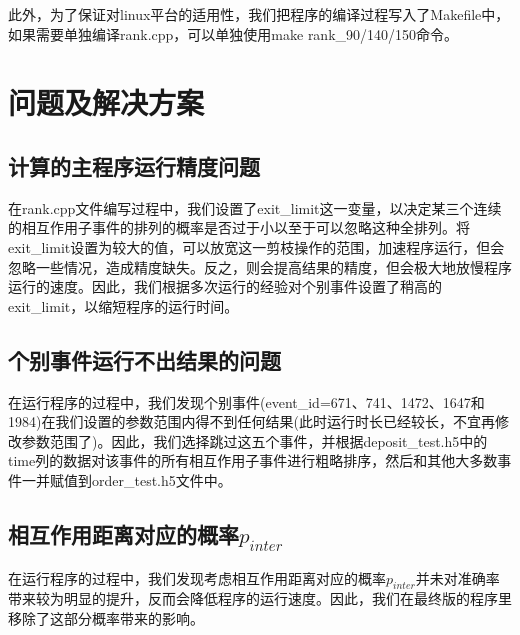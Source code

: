 \documentclass[12pt,a4paper]{article}%
\begin{document}
此外，为了保证对linux平台的适用性，我们把程序的编译过程写入了Makefile中，如果需要单独编译rank.cpp，可以单独使用make rank\_90/140/150命令。

\newpage
\section{问题及解决方案}
\subsection{计算的主程序运行精度问题}
在rank.cpp文件编写过程中，我们设置了exit\_limit这一变量，以决定某三个连续的相互作用子事件的排列的概率是否过于小以至于可以忽略这种全排列。将exit\_limit设置为较大的值，可以放宽这一剪枝操作的范围，加速程序运行，但会忽略一些情况，造成精度缺失。反之，则会提高结果的精度，但会极大地放慢程序运行的速度。因此，我们根据多次运行的经验对个别事件设置了稍高的exit\_limit，以缩短程序的运行时间。

\subsection{个别事件运行不出结果的问题}
在运行程序的过程中，我们发现个别事件(event\_id=671、741、1472、1647和1984)在我们设置的参数范围内得不到任何结果(此时运行时长已经较长，不宜再修改参数范围了)。因此，我们选择跳过这五个事件，并根据deposit\_test.h5中的time列的数据对该事件的所有相互作用子事件进行粗略排序，然后和其他大多数事件一并赋值到order\_test.h5文件中。

\subsection{相互作用距离对应的概率$p_{inter}$}
在运行程序的过程中，我们发现考虑相互作用距离对应的概率$p_{inter}$并未对准确率带来较为明显的提升，反而会降低程序的运行速度。因此，我们在最终版的程序里移除了这部分概率带来的影响。
\end{document}
